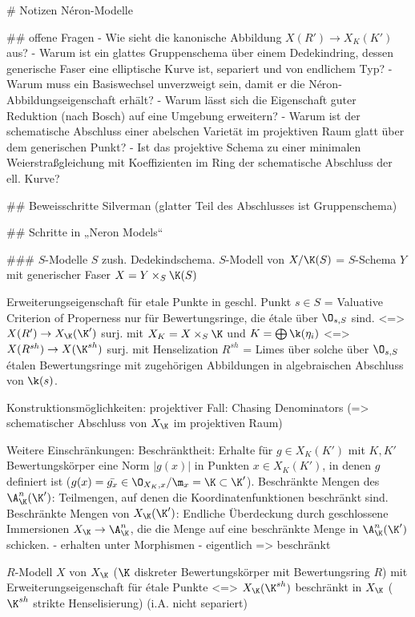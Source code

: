 # Notizen Néron-Modelle

## offene Fragen
- Wie sieht die kanonische Abbildung $X(R')\to X_K(K')$ aus?
- Warum ist ein glattes Gruppenschema über einem Dedekindring, dessen
  generische Faser eine elliptische Kurve ist, separiert und von
  endlichem Typ?
- Warum muss ein Basiswechsel unverzweigt sein, damit er die
  Néron-Abbildungseigenschaft erhält?
- Warum lässt sich die Eigenschaft guter Reduktion (nach Bosch) auf
  eine Umgebung erweitern?
- Warum ist der schematische Abschluss einer abelschen Varietät im
  projektiven Raum glatt über dem generischen Punkt?
- Ist das projektive Schema zu einer minimalen Weierstraßgleichung mit
  Koeffizienten im Ring der schematische Abschluss der ell. Kurve?

## Beweisschritte Silverman (glatter Teil des Abschlusses ist Gruppenschema)



## Schritte in „Neron Models“

### $S$-Modelle 
$S$ zush. Dedekindschema.
$S$-Modell von $X/\K(S)$ = $S$-Schema $Y$ mit generischer Faser $X=Y \times_S \K(S)$

Erweiterungseigenschaft für etale Punkte in geschl. Punkt $s\in S$
= Valuative Criterion of Properness nur für Bewertungsringe, die étale
über $\O_{s,S}$ sind.
<=> $X(R') \to X_\K(\K')$ surj.
    mit $X_K=X \times_S \K$ und $K=\bigoplus \k(\eta_i)$
<=> $X(R^{sh}) \to X(\K^{sh})$ surj.
    mit Henselization $R^{sh}$ = Limes über solche über $\O_{s,S}$ étalen
    Bewertungsringe mit zugehörigen Abbildungen in algebraischen Abschluss
    von $\k(s)$.

Konstruktionsmöglichkeiten:
projektiver Fall: Chasing Denominators (=> schematischer Abschluss von
$X_\K$ im projektiven Raum)

Weitere Einschränkungen:
Beschränktheit: Erhalte für $g\in X_K(K')$ mit $K,K'$ Bewertungskörper
eine Norm $|g(x)|$ in Punkten $x\in X_K(K')$, in denen $g$ definiert
ist ($g(x)=\bar{g_x}\in \O_{X_K,x}/\m_x=\K\subset\K' $).
Beschränkte Mengen des $\A_\K^n(\K')$: Teilmengen, auf denen die
Koordinatenfunktionen beschränkt sind.
Beschränkte Mengen von $X_\K(\K')$: Endliche Überdeckung durch
geschlossene Immersionen $X_\K\to\A_\K^n$, die die Menge auf eine
beschränkte Menge in $\A_\K^n(\K')$ schicken.
- erhalten unter Morphismen
- eigentlich => beschränkt

$R$-Modell $X$ von $X_\K$ ($\K$ diskreter Bewertungskörper mit
Bewertungsring $R$) mit Erweiterungseigenschaft für étale Punkte
<=> $X_\K(\K^{sh})$ beschränkt in $X_\K$ ($\K^{sh}$ strikte
Henselisierung)
(i.A. nicht separiert)
